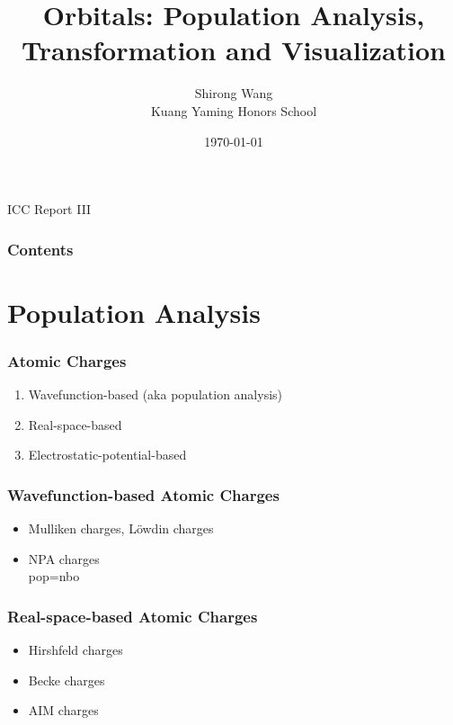 \documentclass[10pt,aspectratio=43]{beamer}
\title{Orbitals: Population Analysis, Transformation and Visualization}	        %
\author[]{            %
    Shirong Wang\\[0.3cm]
    Kuang Yaming Honors School}
\date{\today}
\newcommand{\code}[1]{\colorbox{codegray}{{\Consolas#1}}}
\begin{document}

\begin{frame}
\hfill ICC Report III
\titlepage
\end{frame}

\begin{frame}
\frametitle{Contents}
\tableofcontents
\end{frame}

\section{Population Analysis}
\begin{frame}
\frametitle{Atomic Charges}
\begin{enumerate}
	\item Wavefunction-based (aka population analysis)
	\item Real-space-based
	\item Electrostatic-potential-based
\end{enumerate}
\end{frame}

\begin{frame}
\frametitle{Wavefunction-based Atomic Charges}
\begin{itemize}
	\item Mulliken charges, L\"owdin charges
	\item NPA charges\\
	\code{pop=nbo}
\end{itemize}

\end{frame}

\begin{frame}
\frametitle{Real-space-based Atomic Charges}
\begin{itemize}
	\item Hirshfeld charges
	\item Becke charges
	\item AIM charges
\end{itemize}
\end{frame}

\end{document}
